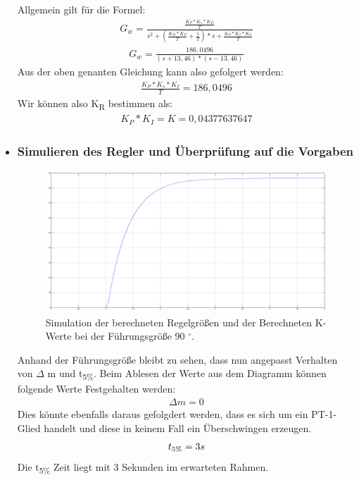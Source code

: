 \documentclass[10pt]{scrartcl}
\begin{document}
\begin{itemize}
Allgemein gilt für die Formel:
\begin{align}
G_{w} = \frac{\frac{K_P * K_s*K_D}{T}}{s^2+(\frac{K_D*K_P}{T}+\frac{1}{T})*s+\frac{K_P*K_I*K_S}{T}}
\end{align} 
\begin{align}
G_{w} = \frac{186,0496}{(s+13,46) * (s-13,46)}
\end{align} 
Aus der oben genanten Gleichung kann also gefolgert werden:
\begin{align}
\frac{K_P * K_s*K_I}{T} =186,0496
\end{align}
Wir können also K\textsubscript{R} bestimmen als:
\begin{align}
K_P * K_I = K = 0,04377637647
\end{align}
\item \subsubsection{Simulieren des Regler und Überprüfung auf die Vorgaben}
\begin{figure}[H]
	\centering
	\includegraphics[width=1.1\textwidth]{Drehzahl6e3neu.png}
	\caption{Simulation der berechneten Regelgrößen und der Berechneten K-Werte bei der Führungsgröße 90 $^\circ$.}
	\label{img:grafik-dummy}
\end{figure}
Anhand der Führungsgröße bleibt zu sehen, dass nun angepasst Verhalten von  $\Delta$ m und t\textsubscript{5\%}.
Beim Ablesen der Werte aus dem Diagramm können folgende Werte Festgehalten werden:
\begin{align}
\Delta m = 0
\end{align}
Dies könnte ebenfalls daraus gefolgdert werden, dass es sich um ein PT-1-Glied handelt und diese in keinem Fall ein Überschwingen erzeugen.
\begin{align}
t\textsubscript{5\%} = 3s
\end{align}
Die t\textsubscript{5\%} Zeit liegt mit 3 Sekunden im erwarteten Rahmen.
\end{itemize}
\end{document}
